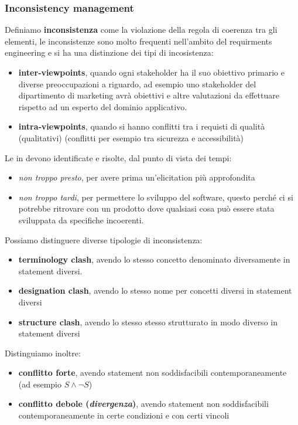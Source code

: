 \subsubsection{Inconsistency management}
Definiamo \textbf{inconsistenza} come la violazione della regola di coerenza tra gli elementi, le inconsistenze sono molto frequenti nell'ambito del requirments engineering e si ha una distinzione dei tipi di incosistenza: 
\begin{itemize}
    \item \textbf{inter‐viewpoints}, quando ogni stakeholder ha il suo obiettivo primario e diverse preoccupazioni a riguardo, ad esempio uno stakeholder del dipartimento di marketing avrà obiettivi e altre valutazioni da effettuare rispetto ad un esperto del dominio applicativo.
    \item \textbf{intra‐viewpoints}, quando si hanno conflitti tra i requisti di qualità (qualitativi) (conflitti per esempio tra sicurezza e accessibilità)
\end{itemize}
Le in devono identificate e risolte, dal punto di vista dei tempi:
\begin{itemize}
  \item \textit{non troppo presto}, per avere prima un'elicitation più approfondita 
  \item \textit{non troppo tardi}, per permettere lo sviluppo del software, questo perché ci si potrebbe ritrovare con un prodotto dove qualsiasi cosa può essere stata sviluppata da specifiche incoerenti.
\end{itemize}

Possiamo distinguere diverse tipologie di inconsistenza:
\begin{itemize}
  \item \textbf{terminology clash}, avendo lo stesso concetto denominato diversamente in statement diversi. 
  \item \textbf{designation clash}, avendo lo stesso nome per concetti diversi in statement diversi
  \item \textbf{structure clash}, avendo lo stesso stesso strutturato in modo diverso in statement diversi
\end{itemize}

Distinguiamo inoltre:
\begin{itemize}
  \item \textbf{conflitto forte}, avendo statement non soddisfacibili contemporaneamente (ad esempio $S\land \neg S$)
  \item \textbf{conflitto debole (\textit{divergenza})}, avendo statement non soddisfacibili contemporaneamente in certe condizioni e con certi vincoli
\end{itemize}

